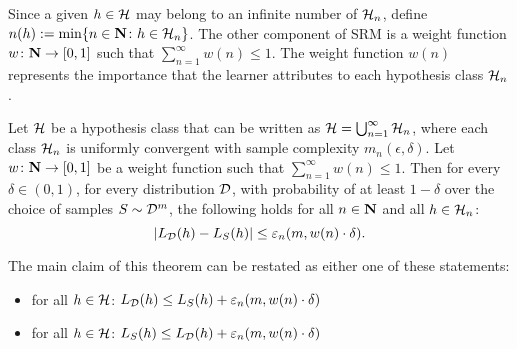 Since a given $h \in \mathcal{H}$ may belong to an infinite number of $\mathcal{H}_n$,
define $n(h) := \min \{n \in \mathbf{N} \colon h \in \mathcal{H}_n \}$. The other
component of SRM is a weight function $w \colon \mathbf{N} \rightarrow [0, 1]$ such
that $\sum_{n = 1}^{\infty} w(n) \leq 1$. The weight function $w(n)$ represents
the importance that the learner attributes to each hypothesis class $\mathcal{H}_n$.

\begin{theorem}
\label{thm:SRM1}
Let $\mathcal{H}$ be a hypothesis class that can be written as $\mathcal{H} =
\bigcup_{n = 1}^{\infty} \mathcal{H}_n$, where each class $\mathcal{H}_n$ is
uniformly convergent with sample complexity $m_n(\epsilon, \delta)$. Let $w
\colon \mathbf{N} \rightarrow [0, 1]$ be a weight function such that  $\sum_{n =
1}^{\infty} w(n) \leq 1$. Then for every $\delta \in (0, 1)$, for every
distribution $\mathcal{D}$, with probability of at least $1 - \delta$ over the choice
of samples $S \sim \mathcal{D}^m$, the following holds for all $n \in \mathbf{N}$ and all
$h \in \mathcal{H}_n$:
\[
    |L_{\mathcal{D}} (h) - L_S (h)| \leq \varepsilon_n (m, w(n) \cdot \delta).
\]
\end{theorem}
The main claim of this theorem can be restated as either
one of these statements:
\begin{itemize}
    \item for all $h \in \mathcal{H}$:
        $L_{\mathcal{D}} (h) \leq L_S(h) + \varepsilon_n (m, w(n) \cdot \delta)$
    \item for all $h \in \mathcal{H}$:
    $L_{S} (h) \leq L_{\mathcal{D}}(h) + \varepsilon_n (m, w(n) \cdot \delta)$
\end{itemize}

